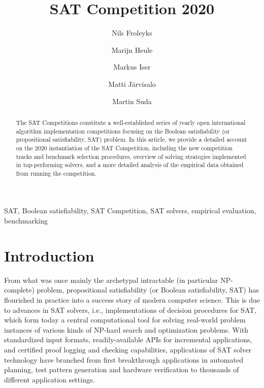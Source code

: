 \documentclass{elsarticle}
\title{SAT Competition 2020\tnoteref{title}}
\author[jku]{Nils Froleyks}
\author[cmu]{Marijn Heule}
\author[kit]{Markus Iser}
\author[uh]{Matti J\"arvisalo}
\author[ctu]{Martin Suda}
\begin{document}
\begin{abstract}
The SAT Competitions constitute a well-established series of yearly open international algorithm implementation competitions
focusing on the Boolean satisfiability (or propositional satisfiability, SAT) problem. 
In this article, we provide
a detailed account on the 2020 instantiation of the SAT Competition, including the 
 new competition tracks and benchmark selection procedures, overview of solving strategies implemented in top-performing solvers, 
and a more detailed analysis of the empirical data obtained from running the competition.
\end{abstract}

\begin{keyword}
SAT, Boolean satisfiability, SAT Competition, SAT solvers, empirical evaluation,
benchmarking
\end{keyword}

\maketitle

\section{Introduction}

From what was once mainly the archetypal intractable (in particular NP-complete) problem, propositional satisfiability 
(or Boolean satisfiability, SAT) has flourished in practice into a success story of modern computer science.
This is due to advances in SAT solvers, i.e., implementations of decision procedures for SAT, which form today a 
central computational tool for solving real-world problem instances of various kinds of NP-hard search and optimization problems.
With standardized input formats, readily-available APIs for incremental applications,
and certified proof logging and checking capabilities, applications of SAT solver technology
have branched from first breakthrough applications in automated planning, test pattern generation and hardware verification
to thousands of different application settings. 
\end{document}
